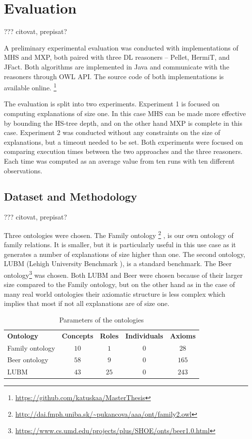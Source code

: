 \documentclass[12pt,a4paper]{article}
\begin{document}
\section{Evaluation}
??? citovat, prepisat?

A preliminary experimental evaluation was conducted with implementations of
MHS and MXP, both paired with three  DL reasoners -- Pellet, HermiT, and
JFact. Both algorithms are implemented in Java and communicate with the
reasoners through OWL API.
%
The source code of both implementations is available online.%
\footnote{\url{https://github.com/katuskaa/MasterThesis}}

The evaluation is split into two experiments. Experiment 1 is focused on
computing explanations of size one. In this case MHS can be
made more effective by bounding the HS-tree depth, and on the other hand
MXP is complete in this case. Experiment 2 was conducted without any
constraints on the size of explanations, but a timeout needed to be set. Both
experiments were focused on comparing execution times between the two
approaches and the three reasoners. Each time was computed as an average
value from ten runs with ten different observations.

\subsection{Dataset and Methodology}
??? citovat, prepisat?

Three ontologies were chosen. The Family ontology%
\footnote{\url{http://dai.fmph.uniba.sk/~pukancova/aaa/ont/family2.owl}}%
, is our own ontology of family relations. It is smaller,
but it is particularly useful in this use case as it generates a number of
explanations of size higher than one. The second ontology, LUBM (Lehigh University
Benchmark \cite{LUBM}), is a standard benchmark. The Beer
ontology\footnote{\url{https://www.cs.umd.edu/projects/plus/SHOE/onts/beer1.0.html}}
was chosen. Both LUBM and Beer were chosen because of their larger size compared to the Family ontology, but on the other hand as in the case of many real world ontologies their axiomatic structure is less complex which implies that most if not all explanations are
of size one.

\begin{table}[h!]
	\scriptsize
	\centering
	\caption{Parameters of the ontologies}
	\label{tab:ont}
	\begin{tabular}{lcccc}
		\scriptsize
		\textbf{Ontology} & \textbf{Concepts} & \textbf{Roles} & \textbf{Individuals} & \textbf{Axioms} \\
		Family ontology & $10$ & $1$ & $0$ & $28$\\
		Beer ontology & $58$ & $9$ & $0$ & $165$\\
		LUBM & $43$ & $25$ & $0$ & $243$
	\end{tabular}
\end{table}
\end{document}
